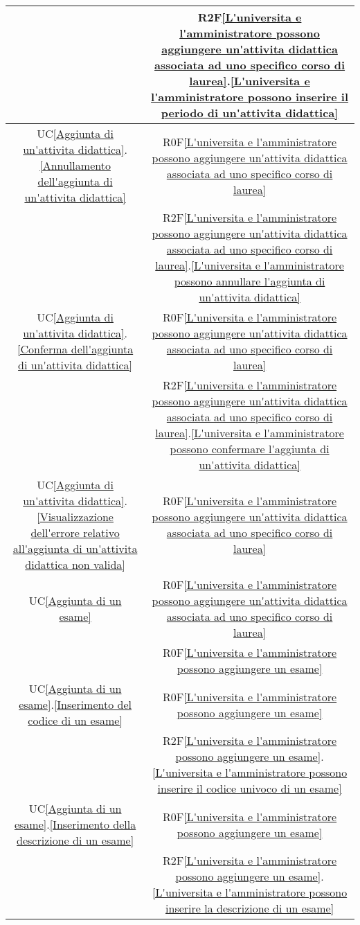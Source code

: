 \begin{longtable}{|c|c|}
& R2F\ref{L'universita e l'amministratore possono aggiungere un'attivita didattica associata ad uno specifico corso di laurea}.\ref{L'universita e l'amministratore possono inserire il periodo di un'attivita didattica}\\
\hline
UC\ref{Aggiunta di un'attivita didattica}.\ref{Annullamento dell'aggiunta di un'attivita didattica} & R0F\ref{L'universita e l'amministratore possono aggiungere un'attivita didattica associata ad uno specifico corso di laurea}\\
& R2F\ref{L'universita e l'amministratore possono aggiungere un'attivita didattica associata ad uno specifico corso di laurea}.\ref{L'universita e l'amministratore possono annullare l'aggiunta di un'attivita didattica}\\
\hline
UC\ref{Aggiunta di un'attivita didattica}.\ref{Conferma dell'aggiunta di un'attivita didattica} & R0F\ref{L'universita e l'amministratore possono aggiungere un'attivita didattica associata ad uno specifico corso di laurea}\\
& R2F\ref{L'universita e l'amministratore possono aggiungere un'attivita didattica associata ad uno specifico corso di laurea}.\ref{L'universita e l'amministratore possono confermare l'aggiunta di un'attivita didattica}\\
\hline
UC\ref{Aggiunta di un'attivita didattica}.\ref{Visualizzazione dell'errore relativo all'aggiunta di un'attivita didattica non valida} & R0F\ref{L'universita e l'amministratore possono aggiungere un'attivita didattica associata ad uno specifico corso di laurea}\\
\hline
UC\ref{Aggiunta di un esame} & R0F\ref{L'universita e l'amministratore possono aggiungere un'attivita didattica associata ad uno specifico corso di laurea}\\
& R0F\ref{L'universita e l'amministratore possono aggiungere un esame}\\
\hline
UC\ref{Aggiunta di un esame}.\ref{Inserimento del codice di un esame} & R0F\ref{L'universita e l'amministratore possono aggiungere un esame}\\
& R2F\ref{L'universita e l'amministratore possono aggiungere un esame}.\ref{L'universita e l'amministratore possono inserire il codice univoco di un esame}\\
\hline
UC\ref{Aggiunta di un esame}.\ref{Inserimento della descrizione di un esame} & R0F\ref{L'universita e l'amministratore possono aggiungere un esame}\\
& R2F\ref{L'universita e l'amministratore possono aggiungere un esame}.\ref{L'universita e l'amministratore possono inserire la descrizione di un esame}\\

\end{longtable}
